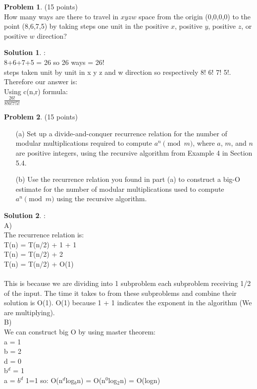 \documentclass{article}
\theoremstyle{definition}
\newtheorem{problem}{Problem}
\newtheorem*{solution}{Solution}
\begin{document}
\newpage

\begin{problem} (15 points)\\
How many ways are there to travel in $xyzw$ space from the origin (0,0,0,0) to the point (8,6,7,5) by taking steps one unit in the positive $x$, positive $y$, positive $z$, or positive $w$ direction?
\end{problem}
\begin{solution} : \\

8+6+7+5 = 26 so 26 ways = 26!
\\
steps taken unit by unit in x y z and w direction so respectively 8! 6! 7! 5!.
\\
Therefore our answer is:
\\
Using c(n,r) formula:
\\
$\frac{26!}{8! 6! 7! 5!}$
\end{solution}

\newpage

\begin{problem} (15 points)\\
\begin{enumerate}
\item[(a)] Set up a divide-and-conquer recurrence relation for the number of modular multiplications required to compute $a^n \pmod{m}$, where $a$, $m$, and $n$ are positive integers, using the recursive algorithm from Example 4 in Section 5.4.
\item[(b)] Use the recurrence relation you found in part (a) to construct a big-O estimate for the number of modular multiplications used to compute $a^n \pmod{m}$ using the recursive algorithm.
\end{enumerate}
\end{problem}
\begin{solution} :
\\

A)\\
The recurrence relation is:
\\
T(n) = T(n/2) + 1 + 1 \\
T(n) = T(n/2) + 2 \\ 
T(n) = T(n/2) + O(1) \\
\\
This is because we are dividing into 1 subproblem each subproblem receiving 1/2 of the input. The time it takes to from these subproblems and combine their solution is O(1). O(1) because 1 + 1 indicates the exponent in the algorithm (We are multiplying).
\\

B)\\
We can construct big O by using master theorem:
\\
a = 1\\
b = 2 \\
d = 0 \\
b$^d$ = 1 \\

a = $b^d$  1=1 so: O(n$^d$log$_b$n) = O(n$^0$log$_2$n) = O(logn)
\end{solution}
\end{document}
